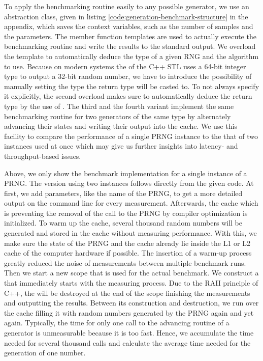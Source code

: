 \documentclass{stdlocal}
\begin{document}
    To apply the benchmarking routine easily to any possible generator, we use an abstraction class, given in listing \ref{code:generation-benchmark-structure} in the appendix, which saves the context variables, such as the number of samples and the  parameters.
    The member function templates  are used to actually execute the benchmarking routine and write the results to the standard output.
    We overload the template to automatically deduce the type of a given RNG and the algorithm to use.
    Because on modern systems the  of the C++ STL uses a 64-bit integer type to output a 32-bit random number, we have to introduce the possibility of manually setting the type the return type will be casted to.
    To not always specify it explicitly, the second overload makes sure to automatically deduce the return type by the use of .
    The third and the fourth variant implement the same benchmarking routine for two generators of the same type by alternately advancing their states and writing their output into the cache.
    We use this facility to compare the performance of a single PRNG instance to the that of two instances used at once which may give us further insights into latency- and throughput-based issues.

    Above, we only show the benchmark implementation for a single instance of a PRNG.
    The version using two instances follows directly from the given code.
    At first, we add  parameters, like the name of the PRNG, to get a more detailed output on the command line for every measurement.
    Afterwards, the cache which is preventing the removal of the call to the PRNG by compiler optimization is initialized.
    To warm up the cache, several thousand random numbers will be generated and stored in the cache without measuring performance.
    With this, we make sure the state of the PRNG and the cache already lie inside the L1 or L2 cache of the computer hardware if possible.
    The insertion of a warm-up process greatly reduced the noise of measurements between multiple benchmark runs.
    Then we start a new scope that is used for the actual benchmark.
    We construct a  that immediately starts with the measuring process.
    Due to the RAII principle of C++, the  will be destroyed at the end of the scope finishing the measurements and outputting the results.
    Between its construction and destruction, we run over the cache filling it with random numbers generated by the PRNG again and yet again.
    Typically, the time for only one call to the advancing routine of a generator is unmeasurable because it is too fast.
    Hence, we accumulate the time needed for several thousand calls and calculate the average time needed for the generation of one number.
\end{document}
